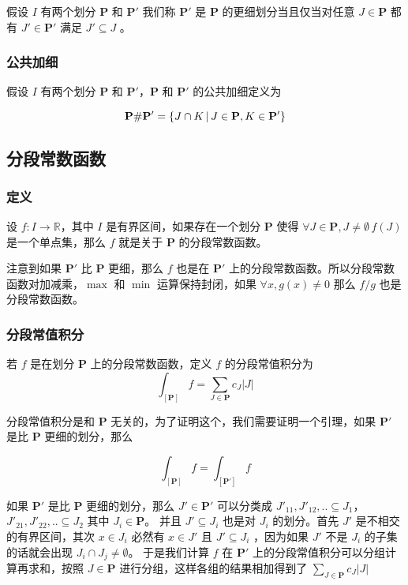 假设 $I $ 有两个划分 $\mathbf{P}$ 和 $\mathbf{P'}$ 我们称 $\mathbf{P'}$ 是 $\mathbf{P}$ 的更细划分当且仅当对任意 $J \in \mathbf{P}$ 都有 $J' \in \mathbf{P'}$ 满足 $J' \subseteq J$ 。

\subsubsection{公共加细}

假设 $I $ 有两个划分 $\mathbf{P}$ 和 $\mathbf{P'}$，$\mathbf{P}$ 和 $\mathbf{P'}$ 的公共加细定义为 

\[
    \mathbf{P} \# \mathbf{P'} = \{ J \cap K \,\vert\, J \in \mathbf{P}, K \in \mathbf{P'}\}
\]

\subsection{分段常数函数}

\subsubsection{定义}
设 $f: I \to \mathbb{R}$，其中 $I$ 是有界区间，如果存在一个划分 $\mathbf{P}$ 使得 $\forall J \in \mathbf{P}, J \ne \emptyset \, f(J)$ 是一个单点集，那么 $f$ 就是关于 $\mathbf{P}$ 的分段常数函数。

注意到如果 $\mathbf{P'}$ 比 $\mathbf{P}$ 更细，那么 $f$ 也是在 $\mathbf{P'}$ 上的分段常数函数。所以分段常数函数对加减乘，$\max$ 和 $\min$ 运算保持封闭，如果 $\forall x, g(x) \ne 0$ 那么 $f/g$ 也是分段常数函数。

\subsubsection{分段常值积分}

若 $f$ 是在划分 $\mathbf{P}$ 上的分段常数函数，定义 $f$ 的分段常值积分为 
\[
    \int_{[\mathbf{P}]} f = \sum_{J \in \mathbf{P}}c_J \lvert J \rvert
\]

分段常值积分是和 $\mathbf{P}$ 无关的，为了证明这个，我们需要证明一个引理，如果 $\mathbf{P'}$ 是比 $\mathbf{P}$ 更细的划分，那么

\[
    \int_{[\mathbf{P}]} f =\int_{[\mathbf{P'}]} f
\]

如果 $\mathbf{P'}$ 是比 $\mathbf{P}$ 更细的划分，那么 $J' \in \mathbf{P'}$ 可以分类成 $J'_{11}, J'_{12}, .. \subseteq J_1$， $J'_{21}, J'_{22}, .. \subseteq J_2$ 其中 $J_i \in \mathbf{P}$。
并且 $J' \subseteq J_i$ 也是对 $J_i$ 的划分。首先 $J'$ 是不相交的有界区间，其次 $x \in J_i$ 必然有 $x \in J'$ 且 $J' \subseteq J_i$ ，因为如果 $J'$ 不是 $J_i$ 的子集的话就会出现 $J_i \cap J_j \ne \emptyset$。
于是我们计算 $f$ 在 $\mathbf{P'}$ 上的分段常值积分可以分组计算再求和，按照 $J \in \mathbf{P}$ 进行分组，这样各组的结果相加得到了 $\sum_{J \in \mathbf{P}}c_J \lvert J \rvert$

